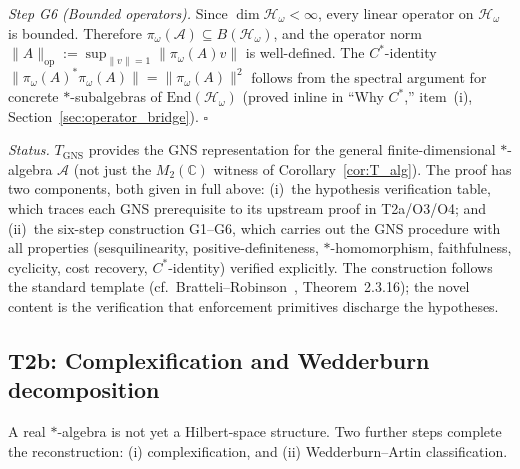 \documentclass[11pt]{article}
\theoremstyle{remark}
\begin{document}
\begin{tcolorbox}[apfbox, title={Theorem $T_{\mathrm{GNS}}$ (GNS Construction: General Case)}]
\textit{Step G6 (Bounded operators).}  Since $\dim \mathcal{H}_\omega < \infty$, every linear operator on $\mathcal{H}_\omega$ is bounded.  Therefore $\pi_\omega(\mathcal{A}) \subseteq B(\mathcal{H}_\omega)$, and the operator norm $\|A\|_{\mathrm{op}} := \sup_{\|v\|=1} \|\pi_\omega(A) v\|$ is well-defined.  The $C^*$-identity $\|\pi_\omega(A)^* \pi_\omega(A)\| = \|\pi_\omega(A)\|^2$ follows from the spectral argument for concrete $*$-subalgebras of $\mathrm{End}(\mathcal{H}_\omega)$ (proved inline in ``Why $C^*$,'' item~(i), Section~\ref{sec:operator_bridge}).  \hfill$\square$

\smallskip\noindent\textit{Status.}  $T_{\mathrm{GNS}}$ provides the GNS representation for the general finite-dimensional $*$-algebra $\mathcal{A}$ (not just the $M_2(\mathbb{C})$ witness of Corollary~\ref{cor:T_alg}).  The proof has two components, both given in full above: (i)~the hypothesis verification table, which traces each GNS prerequisite to its upstream proof in T2a/O3/O4; and (ii)~the six-step construction G1--G6, which carries out the GNS procedure with all properties (sesquilinearity, positive-definiteness, $*$-homomorphism, faithfulness, cyclicity, cost recovery, $C^*$-identity) verified explicitly.  The construction follows the standard template (cf.\ Bratteli--Robinson~\cite{BratteliRobinson1987}, Theorem~2.3.16); the novel content is the verification that enforcement primitives discharge the hypotheses.
\end{tcolorbox}

\subsection{T2b: Complexification and Wedderburn decomposition}

A real $*$-algebra is not yet a Hilbert-space structure.  Two further steps
complete the reconstruction: (i) complexification, and (ii) Wedderburn--Artin
classification.
\end{document}
